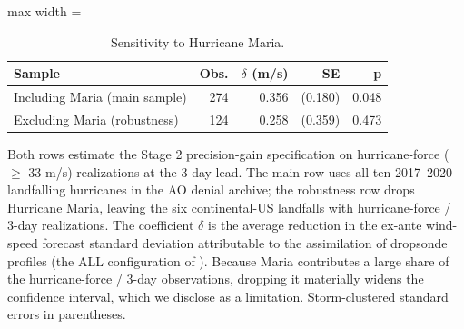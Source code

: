 \begin{table}

\caption{Sensitivity to Hurricane Maria. \label{tab:appB_maria}}
\centering
\begin{adjustbox}{max width = \textwidth}
\begin{threeparttable}
\begin{tabular}[t]{lrrrr}
\toprule
Sample & Obs. & $\delta$ (m/s) & SE & p\\
\midrule
Including Maria (main sample) & 274 & 0.356 & (0.180) & 0.048\\
Excluding Maria (robustness) & 124 & 0.258 & (0.359) & 0.473\\
\bottomrule
\end{tabular}
\begin{tablenotes}
\small
\item Both rows estimate the Stage 2 precision-gain specification on hurricane-force ($\geq$ 33 m/s) realizations at the 3-day lead. The main row uses all ten 2017--2020 landfalling hurricanes in the AO denial archive; the robustness row drops Hurricane Maria, leaving the six continental-US landfalls with hurricane-force / 3-day realizations. The coefficient $\delta$ is the average reduction in the ex-ante wind-speed forecast standard deviation attributable to the assimilation of dropsonde profiles (the ALL configuration of \citet{DitchekEA2023}). Because Maria contributes a large share of the hurricane-force / 3-day observations, dropping it materially widens the confidence interval, which we disclose as a limitation. Storm-clustered standard errors in parentheses.
\end{tablenotes}
\end{threeparttable}
\end{adjustbox}
\end{table}
